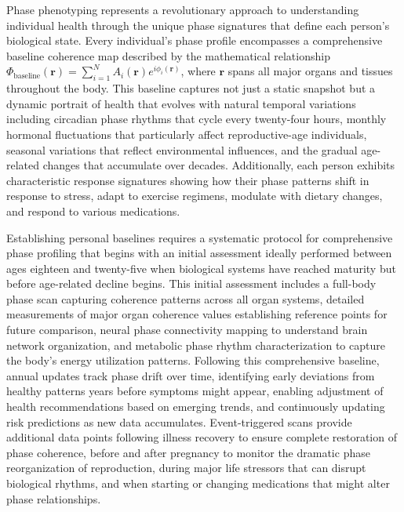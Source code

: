 \documentclass[12pt,a4paper]{report}
\begin{document}
Phase phenotyping represents a revolutionary approach to understanding individual health through the unique phase signatures that define each person's biological state. Every individual's phase profile encompasses a comprehensive baseline coherence map described by the mathematical relationship $\Phi_{\text{baseline}}(\mathbf{r}) = \sum_{i=1}^{N} A_i(\mathbf{r}) e^{i\phi_i(\mathbf{r})}$, where $\mathbf{r}$ spans all major organs and tissues throughout the body. This baseline captures not just a static snapshot but a dynamic portrait of health that evolves with natural temporal variations including circadian phase rhythms that cycle every twenty-four hours, monthly hormonal fluctuations that particularly affect reproductive-age individuals, seasonal variations that reflect environmental influences, and the gradual age-related changes that accumulate over decades. Additionally, each person exhibits characteristic response signatures showing how their phase patterns shift in response to stress, adapt to exercise regimens, modulate with dietary changes, and respond to various medications.

Establishing personal baselines requires a systematic protocol for comprehensive phase profiling that begins with an initial assessment ideally performed between ages eighteen and twenty-five when biological systems have reached maturity but before age-related decline begins. This initial assessment includes a full-body phase scan capturing coherence patterns across all organ systems, detailed measurements of major organ coherence values establishing reference points for future comparison, neural phase connectivity mapping to understand brain network organization, and metabolic phase rhythm characterization to capture the body's energy utilization patterns. Following this comprehensive baseline, annual updates track phase drift over time, identifying early deviations from healthy patterns years before symptoms might appear, enabling adjustment of health recommendations based on emerging trends, and continuously updating risk predictions as new data accumulates. Event-triggered scans provide additional data points following illness recovery to ensure complete restoration of phase coherence, before and after pregnancy to monitor the dramatic phase reorganization of reproduction, during major life stressors that can disrupt biological rhythms, and when starting or changing medications that might alter phase relationships.
\end{document}
